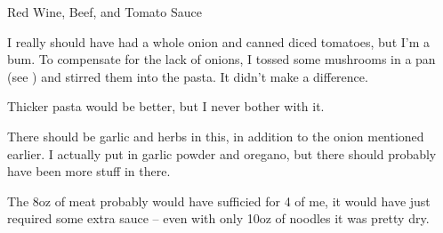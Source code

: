 \documentclass{recipe}
\begin{document}
\begin{recipe}{Red Wine, Beef, and Tomato Sauce}
  \begin{notes}
  \item I really should have had a whole onion and canned diced
    tomatoes, but I'm a bum.  To compensate for the lack of onions, I
    tossed some mushrooms in a pan (see ) and
    stirred them into the pasta.  It didn't make a difference.
  \item Thicker pasta would be better, but I never bother with it.
  \item There should be garlic and herbs in this, in addition to the
    onion mentioned earlier.  I actually put in garlic powder and
    oregano, but there should probably have been more stuff in there.
  \item The 8oz of meat probably would have sufficied for 4 of me, it
    would have just required some extra sauce -- even with only 10oz
    of noodles it was pretty dry.
  \end{notes}
\end{recipe}
\end{document}
